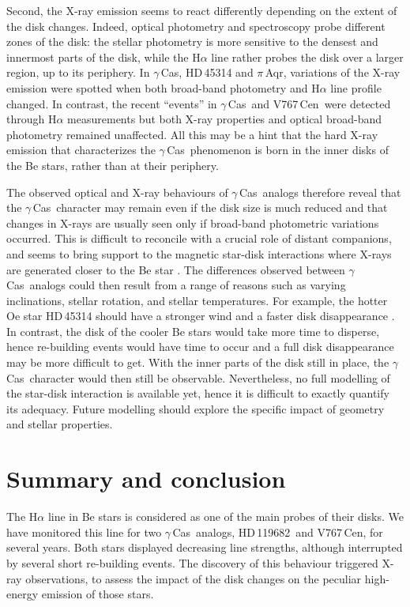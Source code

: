 \documentclass[a4paper,fleqn,usenatbib]{mnras}
\newcommand{\gc}{$\gamma$\,Cas}
\newcommand{\hd}{HD\,119682}
\newcommand{\vc}{V767\,Cen}
\begin{document}
Second, the X-ray emission seems to react differently depending on the extent of the disk changes. Indeed, optical photometry and spectroscopy probe different zones of the disk: the stellar photometry is more sensitive to the densest and innermost parts of the disk, while the H$\alpha$ line rather probes the disk over a larger region, up to its periphery. In \gc, HD\,45314 and $\pi$\,Aqr, variations of the X-ray emission were spotted when both broad-band photometry and H$\alpha$ line profile changed. In contrast, the recent ``events'' in \gc\ and \vc\ were detected through H$\alpha$ measurements but both X-ray properties and optical broad-band photometry remained unaffected. All this may be a hint that the hard X-ray emission that characterizes the \gc\ phenomenon is born in the inner disks of the Be stars, rather than at their periphery.

The observed optical and X-ray behaviours of \gc\ analogs therefore reveal that the \gc\ character may remain even if the disk size is much reduced and that changes in X-rays are usually seen only if broad-band photometric variations occurred. This is difficult to reconcile with a crucial role of distant companions, and seems to bring support to the magnetic star-disk interactions where X-rays are generated closer to the Be star \citep{rob02}. The differences observed between \gc\ analogs could then result from a range of reasons such as varying inclinations, stellar rotation, and stellar temperatures. For example, the hotter Oe star HD\,45314 should have a stronger wind and a faster disk disappearance \citep{kee16}. In contrast, the disk of the cooler Be stars would take more time to disperse, hence re-building events would have time to occur and a full disk disappearance may be more difficult to get. With the inner parts of the disk still in place, the \gc\ character would then still be observable. Nevertheless, no full modelling of the star-disk interaction is available yet, hence it is difficult to exactly quantify its adequacy. Future modelling should explore the specific impact of geometry and stellar properties. 

\section{Summary and conclusion}
The H$\alpha$ line in Be stars is considered as one of the main probes of their disks. We have monitored this line for two \gc\ analogs, \hd\ and \vc, for several years. Both stars displayed decreasing line strengths, although interrupted by several short re-building events. The discovery of this behaviour triggered X-ray observations, to assess the impact of the disk changes on the peculiar high-energy emission of those stars.
\end{document}
